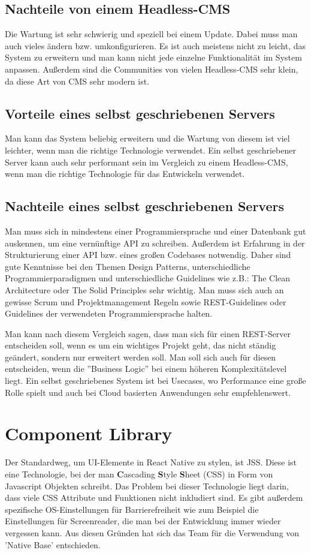 \subsection{Nachteile von einem Headless-CMS}

Die Wartung ist sehr schwierig und speziell bei einem Update. Dabei muss man auch vieles ändern bzw. umkonfigurieren.
Es ist auch meistens nicht zu leicht, das System zu erweitern und man kann nicht jede einzelne Funktionalität im System anpassen.
Außerdem sind die Communities von vielen Headless-CMS sehr klein, da diese Art von CMS sehr modern ist.

\subsection{Vorteile eines selbst geschriebenen Servers}
Man kann das System beliebig erweitern und die Wartung von diesem ist viel leichter, wenn man die richtige Technologie 
verwendet. Ein selbst geschriebener Server kann auch sehr performant sein im Vergleich zu einem Headless-CMS, wenn 
man die richtige Technologie für das Entwickeln verwendet.

\subsection{Nachteile eines selbst geschriebenen Servers}
Man muss sich in mindestens einer Programmiersprache und einer Datenbank gut auskennen,
um eine vernünftige API zu schreiben.
Außerdem ist Erfahrung in der Strukturierung einer API bzw. eines großen Codebases notwendig.
Daher sind gute Kenntnisse bei den Themen Design Patterns, unterschiedliche Programmierparadigmen und unterschiedliche 
Guidelines wie z.B.: The Clean Architecture oder The Solid Principles sehr wichtig. Man muss sich auch an gewisse 
Scrum und Projektmanagement Regeln sowie REST-Guidelines oder Guidelines der verwendeten Programmiersprache halten.


Man kann nach diesem Vergleich sagen, dass man sich für einen REST-Server entscheiden soll, wenn es um ein wichtiges 
Projekt geht, das nicht ständig geändert, sondern nur erweitert werden soll.
Man soll sich auch für diesen entscheiden, wenn die ''Business Logic'' bei einem höheren Komplexitätslevel liegt. Ein 
selbst geschriebenes System ist bei Usecases, wo Performance eine große Rolle spielt und auch bei Cloud basierten 
Anwendungen sehr empfehlenswert.

\section{Component Library}
Der Standardweg, um UI-Elemente in React Native zu stylen, ist JSS. Diese ist eine Technologie, bei der man \textbf{C}ascading \textbf{S}tyle \textbf{S}heet (CSS)
in Form von Javascript Objekten schreibt. Das Problem bei dieser Technologie liegt darin,
dass viele CSS Attribute und Funktionen nicht inkludiert sind. Es gibt außerdem spezifische OS-Einstellungen für Barrierefreiheit wie zum Beispiel die Einstellungen für Screenreader,
die man bei der Entwicklung immer wieder vergessen kann.
Aus diesen Gründen hat sich das Team für die Verwendung von 'Native Base' entschieden.



